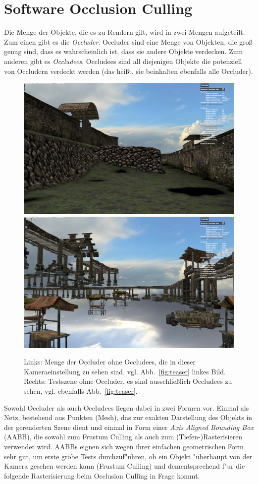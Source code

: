 \documentclass[journal]{vgtc}
\begin{document}
\section{Software Occlusion Culling}
Die Menge der Objekte, die es zu Rendern gilt, wird in zwei Mengen aufgeteilt. Zum einen gibt es die \textit{Occluder}. Occluder sind eine Menge von Objekten, die gro{\ss} genug sind, dass es wahrscheinlich ist, dass sie andere Objekte verdecken. Zum anderen gibt es \textit{Occludees}. Occludees sind all diejenigen Objekte die potenziell von Occludern verdeckt werden (das hei{\ss}t, sie beinhalten ebenfalls alle Occluder).
\begin{figure}%
\includegraphics[width=0.5\columnwidth]{images/Occluder.png}%
\includegraphics[width=0.5\columnwidth]{images/Occludees.png}%
\caption{Links: Menge der Occluder ohne Occludees, die in dieser Kameraeinstellung zu sehen sind, vgl. Abb.\ \ref{fig:teaser} linkes Bild. Rechts: Testszene ohne Occluder, es sind ausschlie{\ss}lich Occludees zu sehen, vgl. ebenfalls Abb.\ \ref{fig:teaser}.}%
\label{fig:objects}%
\end{figure}
 Sowohl Occluder als auch Occludees liegen dabei in zwei Formen vor. Einmal als Netz, bestehend aus Punkten (Mesh), das zur exakten Darstellung des Objekts in der gerenderten Szene dient und einmal in Form einer \textit{Axis Aligned Bounding Box} (AABB), die sowohl zum Frustum Culling als auch zum (Tiefen-)Rasterisieren verwendet wird. AABBs eignen sich wegen ihrer einfachen geometrischen Form sehr gut, um erste grobe Tests durchzuf"uhren, ob ein Objekt "uberhaupt von der Kamera gesehen werden kann (Frustum Culling) und dementsprechend f"ur die folgende Rasterisierung beim Occlusion Culling in Frage kommt. \\
\end{document}

